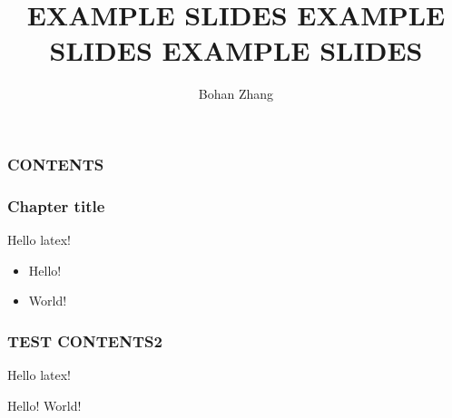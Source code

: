 \documentclass[9pt]{beamer}
\title{EXAMPLE SLIDES EXAMPLE SLIDES EXAMPLE SLIDES}
\author{Bohan Zhang}
\institute{Beihang University}
\begin{document}
\begin{frame}[plain]

    \maketitle

\end{frame}

\begin{frame}
    \frametitle{CONTENTS}
    \tableofcontents
\end{frame}

\begin{frame}
    \frametitle{Chapter title}

    
    
    Hello latex!

    \begin{itemize}
        \item Hello!
        \item World!
    \end{itemize}
    
\end{frame}


\begin{frame}
    \frametitle{TEST CONTENTS2}

    Hello latex!

    \begin{outline}
        \1 Hello!
        \2 World!
    \end{outline}
    

\end{frame}
\end{document}
